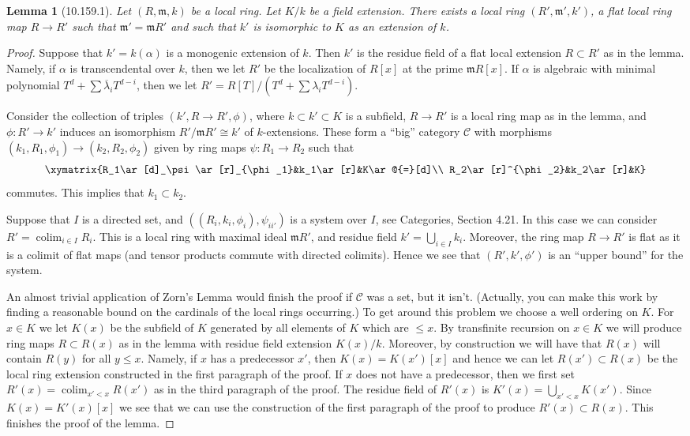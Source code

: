 \documentclass[UTF8,11pt]{ctexart}
\newtheorem*{lemma}{Lemma}
\theoremstyle{definition}
\begin{document}
\begin{lemma}[10.159.1]
Let $(R,\mathfrak m,k)$ be a local ring. Let $K/k$ be a field extension. There exists a local ring $(R',\mathfrak m',k')$, a flat local ring map $R\to R'$ such that $\mathfrak m'=\mathfrak mR'$ and such that $k'$ is isomorphic to $K$ as an extension of $k$.
\end{lemma}
\begin{proof}
Suppose that $k'=k(\alpha)$ is a monogenic extension of $k$. Then $k'$ is the residue field of a flat local extension $R\subset R'$ as in the lemma. Namely, if $\alpha$ is transcendental over $k$, then we let $R'$ be the localization of $R[x]$ at the prime $\mathfrak mR[x]$. If $\alpha$ is algebraic with minimal polynomial $T^d+\sum\overline\lambda_iT^{d-i}$, then we let $R'=R[T]/(T^d+\sum\lambda_iT^{d-i})$.

Consider the collection of triples $(k',R\to R',\phi)$, where $k\subset k'\subset K$ is a subfield, $R\to R'$ is a local ring map as in the lemma, and $\phi:R'\to k'$ induces an isomorphism $R'/\mathfrak mR'\cong k'$ of $k$-extensions. These form a ``big'' category $\mathcal C$ with morphisms $(k_1,R_1,\phi_1)\to(k_2,R_2,\phi_2)$ given by ring maps $\psi:R_1\to R_2$ such that
\[
\xymatrix{R_1\ar[d]_\psi\ar[r]_{\phi_1}&k_1\ar[r]&K\ar@{=}[d]\\
R_2\ar[r]^{\phi_2}&k_2\ar[r]&K}
\]
commutes. This implies that $k_1\subset k_2$.

Suppose that $I$ is a directed set, and $((R_i,k_i,\phi_i),\psi_{ii'})$ is a system over $I$, see Categories, Section 4.21. In this case we can consider $R'=\operatorname{colim}_{i\in I}R_i$. This is a local ring with maximal ideal $\mathfrak mR'$, and residue field $k'=\bigcup_{i\in I}k_i$. Moreover, the ring map $R\to R'$ is flat as it is a colimit of flat maps (and tensor products commute with directed colimits). Hence we see that $(R',k',\phi')$ is an ``upper bound'' for the system.

An almost trivial application of Zorn's Lemma would finish the proof if $\mathcal C$ was a set, but it isn't. (Actually, you can make this work by finding a reasonable bound on the cardinals of the local rings occurring.) To get around this problem we choose a well ordering on $K$. For $x\in K$ we let $K(x)$ be the subfield of $K$ generated by all elements of $K$ which are $\leq x$. By transfinite recursion on $x\in K$ we will produce ring maps $R\subset R(x)$ as in the lemma with residue field extension $K(x)/k$. Moreover, by construction we will have that $R(x)$ will contain $R(y)$ for all $y\leq x$. Namely, if $x$ has a predecessor $x'$, then $K(x)=K(x')[x]$ and hence we can let $R(x')\subset R(x)$ be the local ring extension constructed in the first paragraph of the proof. If $x$ does not have a predecessor, then we first set $R'(x)=\operatorname{colim}_{x'<x}R(x')$ as in the third paragraph of the proof. The residue field of $R'(x)$ is $K'(x)=\bigcup_{x'<x}K(x')$. Since $K(x)=K'(x)[x]$ we see that we can use the construction of the first paragraph of the proof to produce $R'(x)\subset R(x)$. This finishes the proof of the lemma.
\end{proof}
\end{document}
